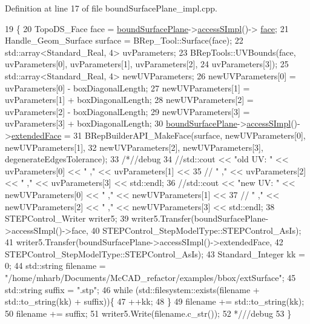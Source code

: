 Definition at line 17 of file bound\+Surface\+Plane\+\_\+impl.\+cpp.


\begin{DoxyCode}
19                                                \{
20     TopoDS\_Face face = \hyperlink{classMcCAD_1_1Geometry_1_1BoundSurfacePlane_1_1Impl_a272076fe54fdd949acb310eece31f498}{boundSurfacePlane}->\hyperlink{classMcCAD_1_1Geometry_1_1Surface_a989de1f9ebe3de043412014ed25e52eb}{accessSImpl}()->
      \hyperlink{classMcCAD_1_1Geometry_1_1Surface_1_1Impl_abf7c4dc859404ce42b425c7d6b578f69}{face};
21     Handle\_Geom\_Surface surface = BRep\_Tool::Surface(face);
22     std::array<Standard\_Real, 4> uvParameters;
23     BRepTools::UVBounds(face, uvParameters[0], uvParameters[1], uvParameters[2],
24                         uvParameters[3]);
25     std::array<Standard\_Real, 4> newUVParameters;
26     newUVParameters[0] = uvParameters[0] - boxDiagonalLength;
27     newUVParameters[1] = uvParameters[1] + boxDiagonalLength;
28     newUVParameters[2] = uvParameters[2] - boxDiagonalLength;
29     newUVParameters[3] = uvParameters[3] + boxDiagonalLength;
30     \hyperlink{classMcCAD_1_1Geometry_1_1BoundSurfacePlane_1_1Impl_a272076fe54fdd949acb310eece31f498}{boundSurfacePlane}->\hyperlink{classMcCAD_1_1Geometry_1_1Surface_a989de1f9ebe3de043412014ed25e52eb}{accessSImpl}()->\hyperlink{classMcCAD_1_1Geometry_1_1Surface_1_1Impl_afaca81a1a3f54b93988737ac7085a0f2}{extendedFace} =
31     BRepBuilderAPI\_MakeFace(surface, newUVParameters[0], newUVParameters[1],
32           newUVParameters[2], newUVParameters[3], degenerateEdgesTolerance);
33     \textcolor{comment}{/*//debug}
34 \textcolor{comment}{    //std::cout << "old UV: " << uvParameters[0] << " ," << uvParameters[1] <<}
35 \textcolor{comment}{    //             " ," << uvParameters[2] << " ," << uvParameters[3] << std::endl;}
36 \textcolor{comment}{    //std::cout << "new UV: " << newUVParameters[0] << " ," << newUVParameters[1] <<}
37 \textcolor{comment}{    //             " ," << newUVParameters[2] << " ," << newUVParameters[3] << std::endl;}
38 \textcolor{comment}{    STEPControl\_Writer writer5;}
39 \textcolor{comment}{    writer5.Transfer(boundSurfacePlane->accessSImpl()->face,}
40 \textcolor{comment}{                     STEPControl\_StepModelType::STEPControl\_AsIs);}
41 \textcolor{comment}{    writer5.Transfer(boundSurfacePlane->accessSImpl()->extendedFace,}
42 \textcolor{comment}{                     STEPControl\_StepModelType::STEPControl\_AsIs);}
43 \textcolor{comment}{    Standard\_Integer kk = 0;}
44 \textcolor{comment}{    std::string filename = "/home/mharb/Documents/McCAD\_refactor/examples/bbox/extSurface";}
45 \textcolor{comment}{    std::string suffix = ".stp";}
46 \textcolor{comment}{    while (std::filesystem::exists(filename + std::to\_string(kk) + suffix))\{}
47 \textcolor{comment}{        ++kk;}
48 \textcolor{comment}{    \}}
49 \textcolor{comment}{    filename += std::to\_string(kk);}
50 \textcolor{comment}{    filename += suffix;}
51 \textcolor{comment}{    writer5.Write(filename.c\_str());}
52 \textcolor{comment}{    */}\textcolor{comment}{//debug}
53 \}
\end{DoxyCode}
